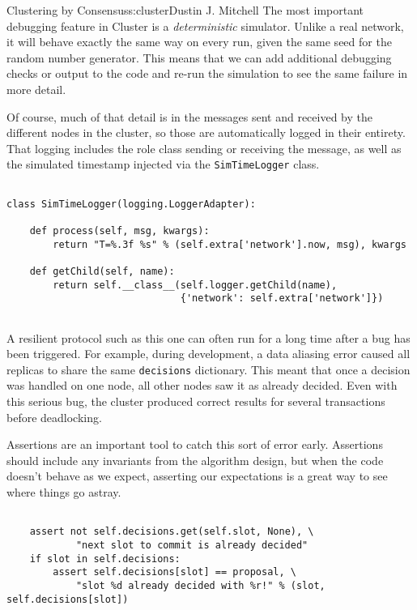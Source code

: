 \begin{aosachapter}{Clustering by Consensus}{s:cluster}{Dustin J. Mitchell}
The most important debugging feature in Cluster is a
\emph{deterministic} simulator. Unlike a real network, it will behave
exactly the same way on every run, given the same seed for the random
number generator. This means that we can add additional debugging checks
or output to the code and re-run the simulation to see the same failure
in more detail.

Of course, much of that detail is in the messages sent and received by
the different nodes in the cluster, so those are automatically logged in
their entirety. That logging includes the role class sending or
receiving the message, as well as the simulated timestamp injected via
the \texttt{SimTimeLogger} class.

\begin{verbatim}

class SimTimeLogger(logging.LoggerAdapter):

    def process(self, msg, kwargs):
        return "T=%.3f %s" % (self.extra['network'].now, msg), kwargs

    def getChild(self, name):
        return self.__class__(self.logger.getChild(name),
                              {'network': self.extra['network']})
    
\end{verbatim}

A resilient protocol such as this one can often run for a long time
after a bug has been triggered. For example, during development, a data
aliasing error caused all replicas to share the same \texttt{decisions}
dictionary. This meant that once a decision was handled on one node, all
other nodes saw it as already decided. Even with this serious bug, the
cluster produced correct results for several transactions before
deadlocking.

Assertions are an important tool to catch this sort of error early.
Assertions should include any invariants from the algorithm design, but
when the code doesn't behave as we expect, asserting our expectations is
a great way to see where things go astray.

\begin{verbatim}

    assert not self.decisions.get(self.slot, None), \
            "next slot to commit is already decided"
    if slot in self.decisions:
        assert self.decisions[slot] == proposal, \
            "slot %d already decided with %r!" % (slot, self.decisions[slot])
    
\end{verbatim}


\end{aosachapter}
